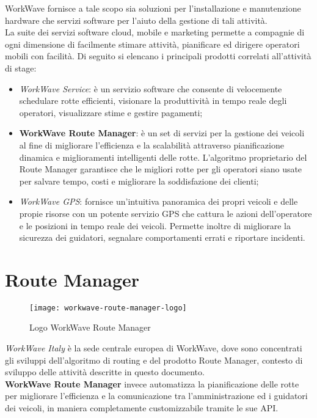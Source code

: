 WorkWave fornisce a tale scopo sia soluzioni per l'installazione e manutenzione hardware che servizi software per l'aiuto della gestione di tali attività. \\

La suite dei servizi software cloud, mobile e marketing permette a compagnie di ogni dimensione di facilmente stimare attività, pianificare ed dirigere operatori mobili con facilità. Di seguito si elencano i principali prodotti correlati all'attività di stage:

\begin{itemize}
  \item \textit{WorkWave Service}: è un servizio software che consente di velocemente schedulare rotte efficienti, visionare la produttività in tempo reale degli operatori, visualizzare stime e gestire pagamenti;
  \item \textbf{WorkWave Route Manager}: è un set di servizi per la gestione dei veicoli al fine di migliorare l'efficienza e la scalabilità attraverso pianificazione dinamica e miglioramenti intelligenti delle rotte. L'algoritmo proprietario del Route Manager garantisce che le migliori rotte per gli operatori siano usate per salvare tempo, costi e migliorare la soddisfazione dei clienti;
  \item \textit{WorkWave GPS}: fornisce un'intuitiva panoramica dei propri veicoli e delle propie risorse con un potente servizio GPS che cattura le azioni dell'operatore e le posizioni in tempo reale dei veicoli. Permette inoltre di migliorare la sicurezza dei guidatori, segnalare comportamenti errati e riportare incidenti.
\end{itemize}

\section{Route Manager}

\begin{figure}[h] 
  \centering 
  \texttt{[image: workwave-route-manager-logo]} 
  \caption{Logo WorkWave Route Manager}
\end{figure}

\textit{WorkWave Italy} è la sede centrale europea di WorkWave, dove sono concentrati gli sviluppi dell'algoritmo di routing e del prodotto Route Manager, contesto di sviluppo delle attività descritte in questo documento. \\

\textbf{WorkWave Route Manager} invece automatizza la pianificazione delle rotte per migliorare l'efficienza e la comunicazione tra l'amministrazione ed i guidatori dei veicoli, in maniera completamente customizzabile tramite le sue API. \\

